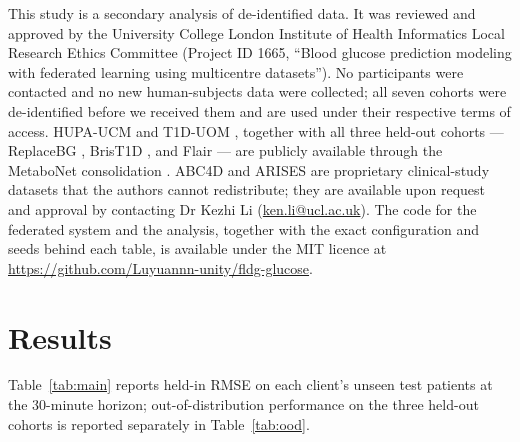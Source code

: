 \documentclass[10pt,letterpaper]{article}
\begin{document}
This study is a secondary analysis of de-identified data. It was reviewed and
approved by the University College London Institute of Health Informatics Local
Research Ethics Committee (Project ID 1665, ``Blood glucose prediction modeling
with federated learning using multicentre datasets''). No participants were
contacted and no new human-subjects data were collected; all seven cohorts were
de-identified before we received them and are used under their respective terms
of access. HUPA-UCM \cite{hidalgo2024hupaucm} and T1D-UOM
\cite{alsuhaymi2025t1duom}, together with all three held-out cohorts ---
ReplaceBG \cite{aleppo2017replacebg}, BrisT1D \cite{james2025brist1d}, and Flair
\cite{jaeb_flair} --- are publicly available through the MetaboNet consolidation
\cite{wolff2026metabonet}. ABC4D \cite{abc4d_nct} and ARISES
\cite{zhu2022arises} are proprietary clinical-study datasets that the authors
cannot redistribute; they are available upon request and approval by contacting
Dr Kezhi Li (\href{mailto:ken.li@ucl.ac.uk}{ken.li@ucl.ac.uk}). The code for the
federated system and the analysis, together with the exact configuration and
seeds behind each table, is available under the MIT licence at
\url{https://github.com/Luyuannn-unity/fldg-glucose}.

\section*{Results}

Table~\ref{tab:main} reports held-in RMSE on each client's unseen test patients at
the 30-minute horizon; out-of-distribution performance on
the three held-out cohorts is reported separately in Table~\ref{tab:ood}.
\end{document}
